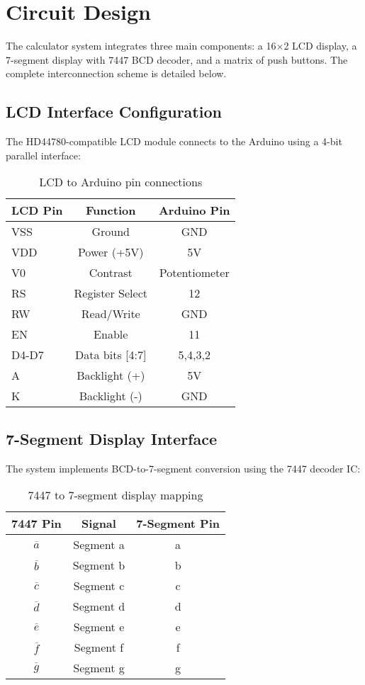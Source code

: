 \documentclass[journal]{IEEEtran}
\begin{document}
\section{Circuit Design}
The calculator system integrates three main components: a 16×2 LCD display, a 7-segment display with 7447 BCD decoder, and a matrix of push buttons. The complete interconnection scheme is detailed below.

\subsection{LCD Interface Configuration}
The HD44780-compatible LCD module connects to the Arduino using a 4-bit parallel interface:

\begin{table}[h]
    \centering
    \begin{tabular}{|>{\ttfamily}l|c|c|}
        \hline
        \textbf{LCD Pin} & \textbf{Function} & \textbf{Arduino Pin} \\
        \hline
        VSS & Ground & GND \\
        VDD & Power (+5V) & 5V \\
        V0 & Contrast & Potentiometer \\
        RS & Register Select & 12 \\
        RW & Read/Write & GND \\
        EN & Enable & 11 \\
        D4-D7 & Data bits [4:7] & 5,4,3,2 \\
        A & Backlight (+) & 5V \\
        K & Backlight (-) & GND \\
        \hline
    \end{tabular}
    \caption{LCD to Arduino pin connections}
    \label{tab:lcd_connections}
\end{table}

\subsection{7-Segment Display Interface}
The system implements BCD-to-7-segment conversion using the 7447 decoder IC:

\begin{table}[h]
    \centering
    \begin{tabular}{|c|c|c|}
        \hline
        \textbf{7447 Pin} & \textbf{Signal} & \textbf{7-Segment Pin} \\
        \hline
        $\overline{a}$ & Segment a & a \\
        $\overline{b}$ & Segment b & b \\
        $\overline{c}$ & Segment c & c \\
        $\overline{d}$ & Segment d & d \\
        $\overline{e}$ & Segment e & e \\
        $\overline{f}$ & Segment f & f \\
        $\overline{g}$ & Segment g & g \\
        \hline
    \end{tabular}
    \caption{7447 to 7-segment display mapping}
    \label{tab:7447_to_7seg}
\end{table}
\end{document}
